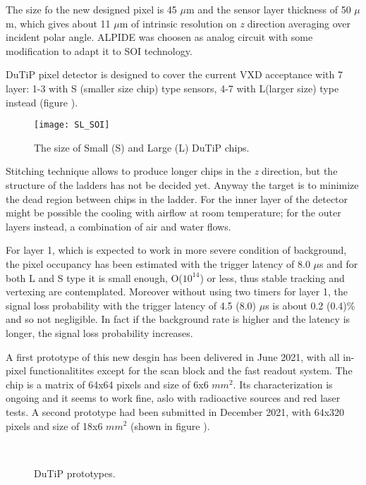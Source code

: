The size fo the new designed pixel is 45 $\mu$m and the sensor layer thickness of 50 $\mu$m, which gives about 11 $\mu$m of intrinsic resolution on \textit{z} direction averaging over incident polar angle. ALPIDE was choosen as analog circuit with some modification to adapt it to SOI technology. 

DuTiP pixel detector is designed to cover the current VXD acceptance with 7 layer: 1-3 with S (smaller size chip) type sensors, 4-7 with L(larger size) type instead (figure ).

\begin{figure}[h!]
\centering
\texttt{[image: SL\_SOI]}
\caption{The size of Small (S) and Large (L) DuTiP chips.}
\label{fig:SL_SOI}
\end{figure}

Stitching technique allows to produce longer chips in the \textit{z} direction, but the structure of the ladders has not be decided yet. Anyway the target is to minimize the dead region between chips in the ladder. For the inner layer of the detector might be possible the cooling with airflow at room temperature; for the outer layers instead, a combination of air and water flows.

For layer 1, which is expected to work in more severe condition of background, the pixel occupancy has been estimated with the trigger latency of 8.0 $\mu$s and for both L and S type it is small enough, O($10^{14}$) or less, thus stable tracking and vertexing are contemplated. Moreover without using two timers for layer 1, the signal loss probability with the trigger latency of 4.5 (8.0) $\mu$s is about 0.2 (0.4)\% and so not negligible. In fact if the background rate is higher and the latency is longer, the signal loss probability increases. 

A first prototype of this new desgin has been delivered in June 2021, with all in-pixel functionalitites except for the scan block and the fast readout system. The chip is a matrix of 64x64 pixels and size of 6x6 $mm^{2}$. Its characterization is ongoing and it seems to work fine, aslo with radioactive sources and red laser tests. A second prototype had been submitted in December 2021, with 64x320 pixels and size of 18x6 $mm^{2}$ (shown in figure ). 


\begin{figure}[h!]
\centering
{}\quad
{}\\
\caption{DuTiP prototypes.}
\label{fig:dutip_matrix}
\end{figure}




